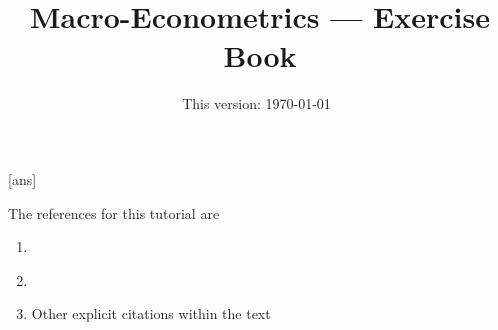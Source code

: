 \documentclass[11pt]{article}
\newcommand*{\varp}[1][p]{VAR(#1)}
\newcommand*{\svarp}[1][p]{SVAR(#1)}
\begin{document}
[ans]

\title{Macro-Econometrics --- Exercise Book}

\author{}

\date{This version: \today ~\currenttime}

\maketitle

The references for this tutorial are
\begin{enumerate}[label=\roman*.]
    \item \cite{MartinHurnHarris-2012}
    \item \cite{Mutschler-2018-github_repo}
    \item Other explicit citations within the text
\end{enumerate}

% 

% 

% 

% 
\end{document}
